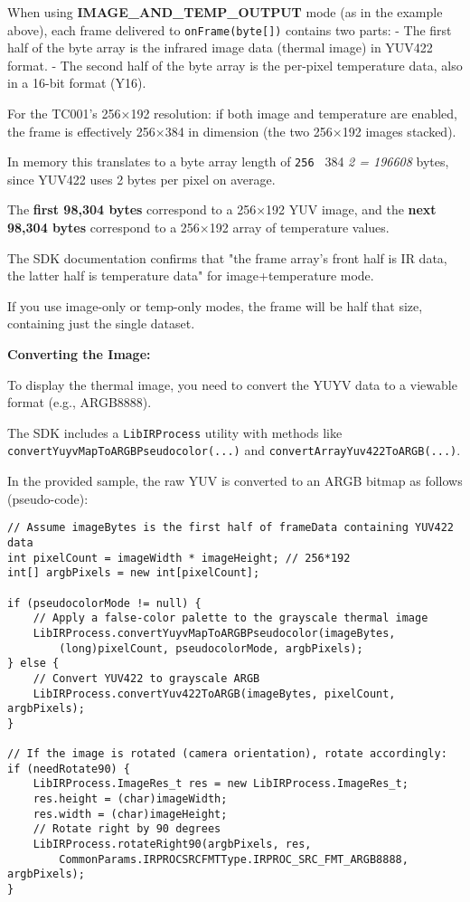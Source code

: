 {When using \textbf{IMAGE_AND_TEMP_OUTPUT}
mode (as in the example above), each frame delivered to \texttt{onFrame(byte[])}
contains two parts: - The first half of the byte array is the infrared image
data (thermal image) in YUV422 format. - The second half of the byte array is
the per-pixel temperature data, also in a 16-bit format (Y16).

For the TC001's 256×192 resolution: if both image and temperature are enabled,
the frame is effectively 256×384 in dimension (the two 256×192 images stacked).

In memory this translates to a byte array length of \texttt{256 } 384 \textit{ 2 = 196608} bytes, since YUV422 uses 2 bytes per pixel on average.

The \textbf{first 98,304 bytes}
 correspond to a 256×192 YUV image, and the \textbf{next 98,304 bytes}
 correspond to a 256×192 array of temperature values.

The SDK documentation confirms that "the frame array's front half is IR data,
the latter half is temperature data" for image+temperature mode.

If you use image-only or temp-only modes, the frame will be half that size,
containing just the single dataset.

\textbf{Converting the Image:}

To display the thermal image, you need to convert the YUYV data to a viewable
format (e.g., ARGB8888).

The SDK includes a \texttt{LibIRProcess} utility with methods like
\texttt{convertYuyvMapToARGBPseudocolor(...)} and
\texttt{convertArrayYuv422ToARGB(...)}.

In the provided sample, the raw YUV is converted to an ARGB bitmap as follows
(pseudo-code):

\begin{verbatim}
// Assume imageBytes is the first half of frameData containing YUV422 data
int pixelCount = imageWidth * imageHeight; // 256*192
int[] argbPixels = new int[pixelCount];

if (pseudocolorMode != null) {
    // Apply a false-color palette to the grayscale thermal image
    LibIRProcess.convertYuyvMapToARGBPseudocolor(imageBytes, 
        (long)pixelCount, pseudocolorMode, argbPixels);
} else {
    // Convert YUV422 to grayscale ARGB
    LibIRProcess.convertYuv422ToARGB(imageBytes, pixelCount, argbPixels);
}

// If the image is rotated (camera orientation), rotate accordingly:
if (needRotate90) {
    LibIRProcess.ImageRes_t res = new LibIRProcess.ImageRes_t;
    res.height = (char)imageWidth;
    res.width = (char)imageHeight;
    // Rotate right by 90 degrees
    LibIRProcess.rotateRight90(argbPixels, res, 
        CommonParams.IRPROCSRCFMTType.IRPROC_SRC_FMT_ARGB8888, argbPixels);
}


\end{verbatim}}
